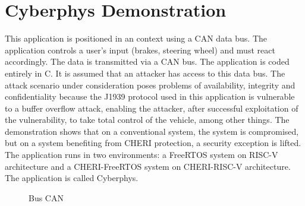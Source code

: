 \documentclass[a4paper, 11pt]{article}
\begin{document}
\section{Cyberphys Demonstration}

This application is positioned in an  context using a CAN data bus. The application controls a user's input (brakes, steering wheel) and must react accordingly. The data is transmitted via a CAN bus.
The application is coded entirely in C.
It is assumed that an attacker has access to this data bus. The attack scenario under consideration poses problems of availability, integrity and confidentiality because the J1939 protocol used in this application is vulnerable to a buffer overflow attack, enabling the attacker, after successful exploitation of the vulnerability, to take total control of the vehicle, among other things. The demonstration shows that on a conventional system, the system is compromised, but on a system benefiting from CHERI protection, a security exception is lifted. \\
The application runs in two environments: a FreeRTOS system on RISC-V architecture and a CHERI-FreeRTOS system on CHERI-RISC-V architecture. The application is called Cyberphys.
\begin{figure}
        \begin{center}
        \end{center}
        \caption{Bus CAN} 
		\label{fig:canbus}

\end{figure}
\end{document}
